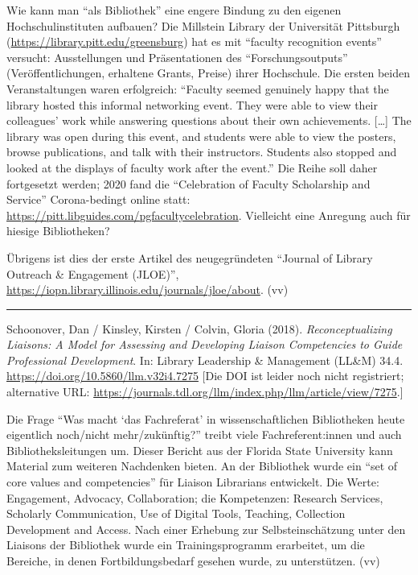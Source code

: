 \documentclass[a4paper,
fontsize=11pt,
oneside,
numbers=noperiodatend,
parskip=half-,
bibliography=totoc,
final
]{scrartcl}
\begin{document}
Wie kann man \enquote{als Bibliothek} eine engere Bindung zu den eigenen
Hochschulinstituten aufbauen? Die Millstein Library der Universität
Pittsburgh (\url{https://library.pitt.edu/greensburg}) hat es mit
\enquote{faculty recognition events} versucht: Ausstellungen und
Präsentationen des \enquote{Forschungsoutputs} (Veröffentlichungen,
erhaltene Grants, Preise) ihrer Hochschule. Die ersten beiden
Veranstaltungen waren erfolgreich: \enquote{Faculty seemed genuinely
happy that the library hosted this informal networking event. They were
able to view their colleagues' work while answering questions about
their own achievements. {[}\ldots{]} The library was open during this
event, and students were able to view the posters, browse publications,
and talk with their instructors. Students also stopped and looked at the
displays of faculty work after the event.} Die Reihe soll daher
fortgesetzt werden; 2020 fand die \enquote{Celebration of Faculty
Scholarship and Service} Corona-bedingt online statt:
\url{https://pitt.libguides.com/pgfacultycelebration}. Vielleicht eine
Anregung auch für hiesige Bibliotheken?

Übrigens ist dies der erste Artikel des neugegründeten \enquote{Journal
of Library Outreach \& Engagement (JLOE)},
\url{https://iopn.library.illinois.edu/journals/jloe/about}. (vv)

\begin{center}\rule{0.5\linewidth}{0.5pt}\end{center}

Schoonover, Dan / Kinsley, Kirsten / Colvin, Gloria (2018).
\emph{Reconceptualizing Liaisons: A Model for Assessing and Developing
Liaison Competencies to Guide Professional Development}. In: Library
Leadership \& Management (LL\&M) 34.4.
\url{https://doi.org/10.5860/llm.v32i4.7275} {[}Die DOI ist leider noch
nicht registriert; alternative URL:
\url{https://journals.tdl.org/llm/index.php/llm/article/view/7275}.{]}

Die Frage \enquote{Was macht \enquote*{das Fachreferat} in
wissenschaftlichen Bibliotheken heute eigentlich noch/nicht
mehr/zukünftig?} treibt viele Fachreferent:innen und auch
Bibliotheksleitungen um. Dieser Bericht aus der Florida State University
kann Material zum weiteren Nachdenken bieten. An der Bibliothek wurde
ein \enquote{set of core values and competencies} für Liaison Librarians
entwickelt. Die Werte: Engagement, Advocacy, Collaboration; die
Kompetenzen: Research Services, Scholarly Communication, Use of Digital
Tools, Teaching, Collection Development and Access. Nach einer Erhebung
zur Selbsteinschätzung unter den Liaisons der Bibliothek wurde ein
Trainingsprogramm erarbeitet, um die Bereiche, in denen
Fortbildungsbedarf gesehen wurde, zu unterstützen. (vv)
\end{document}
